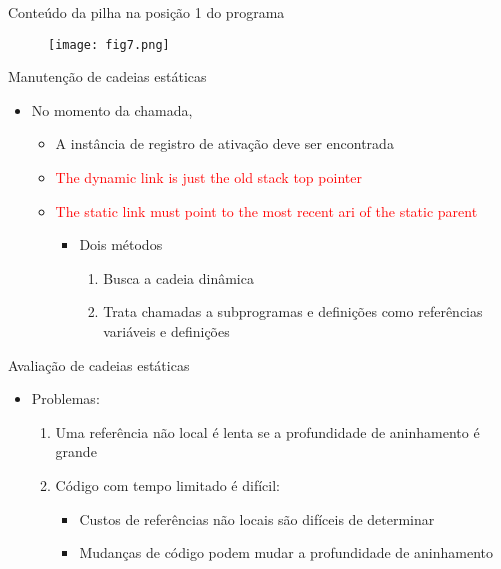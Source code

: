 \documentclass[10pt]{beamer}
\begin{document}
\begin{frame}{Conteúdo da pilha na posição 1 do programa}
\begin{figure}
          \texttt{[image: fig7.png]}
        \end{figure}

\end{frame}

\begin{frame}{Manutenção de cadeias estáticas}

\begin{itemize}
	\item No momento da chamada,
	\begin{itemize}
	    \item A instância de registro de ativação deve ser encontrada
	    \item \textcolor{red}{The dynamic link is just the old stack top pointer}
	    \item \textcolor{red}{The static link must point to the most recent ari of the static parent}
	    \begin{itemize}
	    \item Dois métodos
	    \begin{enumerate}
	    \item Busca a cadeia dinâmica
	    \item Trata chamadas a subprogramas e definições como referências variáveis e definições
	    \end{enumerate}
	    \end{itemize}
	\end{itemize}
\end{itemize}

\end{frame}

\begin{frame}{Avaliação de cadeias estáticas}

\begin{itemize}
	\item Problemas: 
	\begin{enumerate}
	    \item Uma referência não local é lenta se a profundidade de aninhamento é grande
	    \item Código com tempo limitado é difícil:
	    \begin{itemize}
            \item Custos de referências não locais são difíceis de determinar
            \item Mudanças de código podem mudar a profundidade de aninhamento
        \end{itemize}
	\end{enumerate}
\end{itemize}

\end{frame}
\end{document}
